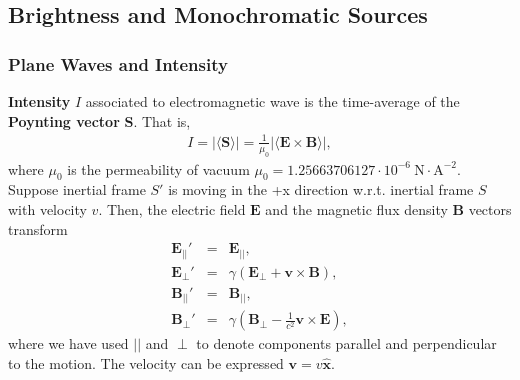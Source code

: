 \documentclass [12pt, a4paper] {article}
\newcommand{\vu}[1]
{
	\mathbf{\hat #1}
}
\newcommand{\vc}[1]
{
	\boldsymbol{#1}
}
\begin{document}
\subsection{Brightness and Monochromatic Sources}
\subsubsection{Plane Waves and Intensity}
\textbf{Intensity} $I$ associated to electromagnetic wave is the time-average of the 
\textbf{Poynting vector} $\vc S$. That is,
\begin {eqnarray}
    I = |\langle\vc S\rangle| = \frac{1}{\mu_0}|\langle\vc E\times\vc B\rangle|,
\end {eqnarray} 
where $\mu_0$ is the permeability of vacuum 
$\mu_0 = 1.25663706127\cdot 10^{-6}\:\textrm{N}\cdot\textrm{A}^{-2}$.
Suppose inertial frame $S'$ is moving in the +x direction w.r.t. inertial frame 
$S$ with velocity $v$. Then, the electric field $\vc E$ and the magnetic flux 
density $\vc B$ vectors transform \cite{griffiths}
\begin {eqnarray}
\label{eq:lorentz_plane1}
\vc E_{||}'    &=& \vc E_{||}, \\
\vc E_{\perp}' &=& \gamma\left(\vc E_{\perp} + \vc v\times\vc B\right), \\
\vc B_{||}'    &=& \vc B_{||}, \\
\label{eq:lorentz_plane4}
\vc B_{\perp}' &=& \gamma\left(\vc B_{\perp} - \frac{1}{c^2}\vc v\times\vc E\right), 
\end {eqnarray}
where we have used $||$ and $\perp$ to denote components parallel and perpendicular 
to the motion. The velocity can be expressed $\vc v = v\vu x$.
\end{document}
